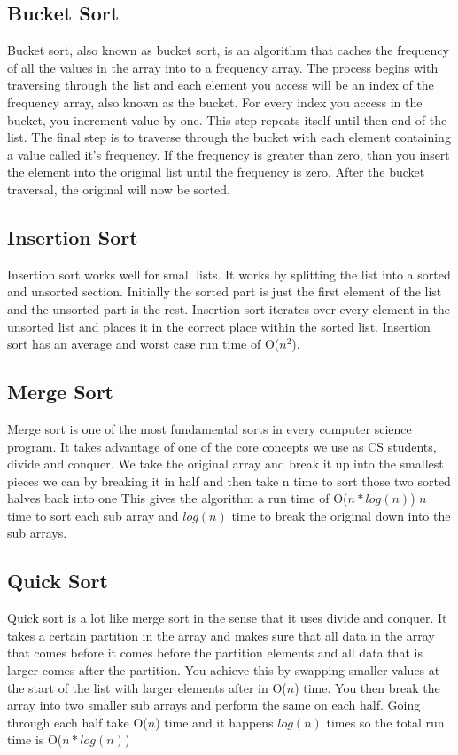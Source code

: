 \documentclass{article}
\begin{document}
\subsection{Bucket Sort}
Bucket sort, also known as bucket sort, is an algorithm that caches the frequency of all the values in the array into to a frequency array. The process begins with traversing through the list and each element you access will be an index of the frequency array, also known as the bucket. For every index you access in the bucket, you increment value by one. This step repeats itself until then end of the list. The final step is to traverse through the bucket with each element containing a value called it's frequency. If the frequency is greater than zero, than you insert the element into the original list until the frequency is zero. After the bucket traversal, the original will now be sorted.

\subsection{Insertion Sort}
Insertion sort works well for small lists. It works by splitting the list into a sorted and unsorted section. Initially the sorted part is just the first element of the list and the unsorted part is the rest. Insertion sort iterates over every element in the unsorted list and places it in the correct place within the sorted list. Insertion sort has an average and worst case run time of O($n^2$).
\subsection{Merge Sort}
Merge sort is one of the most fundamental sorts in every computer science program. It takes advantage of one of the core concepts we use as CS students, divide and conquer. We take the original array and break it up into the smallest pieces we can by breaking it in half and then take n time to sort those two sorted halves back into one This gives the algorithm a run time of O($n*log(n)$) $n$ time to sort each sub array and $log(n)$ time to break the original down into the sub arrays.\cite{mergeSort}
\subsection{Quick Sort}
Quick sort is a lot like merge sort in the sense that it uses divide and conquer. It takes a certain partition in the array and makes sure that all data in the array that comes before it comes before the partition elements and all data that is larger comes after the partition. You achieve this by swapping smaller values at the start of the list with larger elements after in O($n$) time. You then break the array into two smaller sub arrays and perform the same on each half. Going through each half take O($n$) time and it happens $log(n)$ times so the total run time is O($n*log(n)$)
\end{document}

